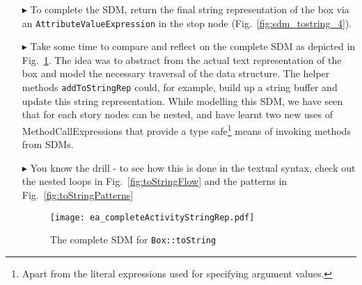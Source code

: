 \begin{itemize}
\item[$\blacktriangleright$] To complete the SDM, return the final string representation of the box via an \texttt{AttributeValueExpression} in the stop node
(Fig.~\ref{fig:sdm_tostring_4}).



\item[$\blacktriangleright$] Take some time to compare and reflect on the complete SDM as depicted in Fig.~\ref{fig:sdm_tostring_5}.  The idea was to abstract
from the actual text representation of the box and model the necessary traversal of the data structure. The helper methods \texttt{addToStringRep} could, for example, build up a
string buffer and update this string representation. While modelling this SDM, we have seen that for each story nodes can be nested, and have learnt two new
uses of MethodCallExpressions that provide a type safe\footnote{Apart from the literal expressions used for specifying argument values.} means of invoking
methods from SDMs.


\item[$\blacktriangleright$] You know the drill - to see how this is done in the textual syntax, check out the nested loops in Fig.~\ref{fig:toStringFlow} and
the patterns in Fig.~\ref{fig:toStringPatterns}

\begin{figure}[htbp]
\begin{center}
  \texttt{[image: ea\_completeActivityStringRep.pdf]}
  \caption{The complete SDM for \texttt{Box::toString}}  
  \label{fig:sdm_tostring_5}
\end{center}
\end{figure}
\FloatBarrier

\end{itemize}
